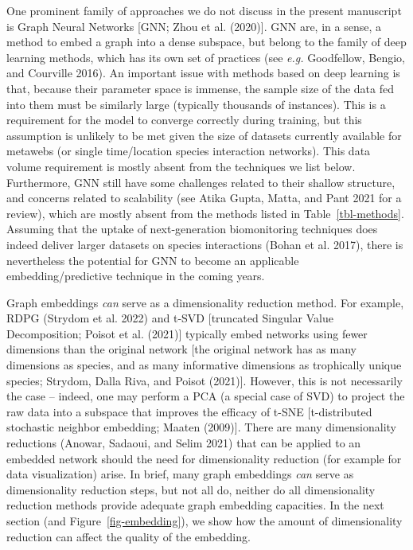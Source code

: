 \documentclass[
  letterpaper,
  DIV=11,
  numbers=noendperiod]{scrartcl}
\begin{document}
\begin{tcolorbox}[enhanced jigsaw, coltitle=black, title=\textcolor{quarto-callout-note-color}{\faInfo}\hspace{0.5em}{Box 1 - Graph Neural Networks}, bottomtitle=1mm, colback=white, breakable, colbacktitle=quarto-callout-note-color!10!white, opacityback=0, left=2mm, arc=.35mm, colframe=quarto-callout-note-color-frame, toptitle=1mm, leftrule=.75mm, rightrule=.15mm, titlerule=0mm, bottomrule=.15mm, toprule=.15mm, opacitybacktitle=0.6]

One prominent family of approaches we do not discuss in the present
manuscript is Graph Neural Networks {[}GNN; Zhou et al. (2020){]}. GNN
are, in a sense, a method to embed a graph into a dense subspace, but
belong to the family of deep learning methods, which has its own set of
practices (see \emph{e.g.} Goodfellow, Bengio, and Courville 2016). An
important issue with methods based on deep learning is that, because
their parameter space is immense, the sample size of the data fed into
them must be similarly large (typically thousands of instances). This is
a requirement for the model to converge correctly during training, but
this assumption is unlikely to be met given the size of datasets
currently available for metawebs (or single time/location species
interaction networks). This data volume requirement is mostly absent
from the techniques we list below. Furthermore, GNN still have some
challenges related to their shallow structure, and concerns related to
scalability (see Atika Gupta, Matta, and Pant 2021 for a review), which
are mostly absent from the methods listed in Table~\ref{tbl-methods}.
Assuming that the uptake of next-generation biomonitoring techniques
does indeed deliver larger datasets on species interactions (Bohan et
al. 2017), there is nevertheless the potential for GNN to become an
applicable embedding/predictive technique in the coming years.

\end{tcolorbox}

Graph embeddings \emph{can} serve as a dimensionality reduction method.
For example, RDPG (Strydom et al. 2022) and t-SVD {[}truncated Singular
Value Decomposition; Poisot et al. (2021){]} typically embed networks
using fewer dimensions than the original network {[}the original network
has as many dimensions as species, and as many informative dimensions as
trophically unique species; Strydom, Dalla Riva, and Poisot (2021){]}.
However, this is not necessarily the case -- indeed, one may perform a
PCA (a special case of SVD) to project the raw data into a subspace that
improves the efficacy of t-SNE {[}t-distributed stochastic neighbor
embedding; Maaten (2009){]}. There are many dimensionality reductions
(Anowar, Sadaoui, and Selim 2021) that can be applied to an embedded
network should the need for dimensionality reduction (for example for
data visualization) arise. In brief, many graph embeddings \emph{can}
serve as dimensionality reduction steps, but not all do, neither do all
dimensionality reduction methods provide adequate graph embedding
capacities. In the next section (and Figure~\ref{fig-embedding}), we
show how the amount of dimensionality reduction can affect the quality
of the embedding.
\end{document}
